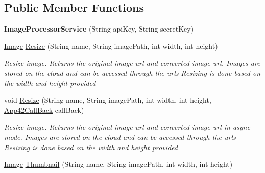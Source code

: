 \subsection*{Public Member Functions}
\begin{DoxyCompactItemize}
\item 
\hypertarget{classcom_1_1shephertz_1_1app42_1_1paas_1_1sdk_1_1csharp_1_1image_processor_1_1_image_processor_service_a2472e305aae946b1708b7ed0b2ae4d7a}{{\bfseries Image\+Processor\+Service} (String api\+Key, String secret\+Key)}\label{classcom_1_1shephertz_1_1app42_1_1paas_1_1sdk_1_1csharp_1_1image_processor_1_1_image_processor_service_a2472e305aae946b1708b7ed0b2ae4d7a}

\item 
\hyperlink{classcom_1_1shephertz_1_1app42_1_1paas_1_1sdk_1_1csharp_1_1image_processor_1_1_image}{Image} \hyperlink{classcom_1_1shephertz_1_1app42_1_1paas_1_1sdk_1_1csharp_1_1image_processor_1_1_image_processor_service_aa44d1dad36e6a0bf2c5f7ec6c914bd20}{Resize} (String name, String image\+Path, int width, int height)
\begin{DoxyCompactList}\small\item\em Resize image. Returns the original image url and converted image url. Images are stored on the cloud and can be accessed through the urls Resizing is done based on the width and height provided \end{DoxyCompactList}\item 
void \hyperlink{classcom_1_1shephertz_1_1app42_1_1paas_1_1sdk_1_1csharp_1_1image_processor_1_1_image_processor_service_a548cd176c784a8bb6bc9670a248d6ab9}{Resize} (String name, String image\+Path, int width, int height, \hyperlink{interfacecom_1_1shephertz_1_1app42_1_1paas_1_1sdk_1_1csharp_1_1_app42_call_back}{App42\+Call\+Back} call\+Back)
\begin{DoxyCompactList}\small\item\em Resize image. Returns the original image url and converted image url in async mode. Images are stored on the cloud and can be accessed through the urls Resizing is done based on the width and height provided \end{DoxyCompactList}\item 
\hyperlink{classcom_1_1shephertz_1_1app42_1_1paas_1_1sdk_1_1csharp_1_1image_processor_1_1_image}{Image} \hyperlink{classcom_1_1shephertz_1_1app42_1_1paas_1_1sdk_1_1csharp_1_1image_processor_1_1_image_processor_service_ae762d4121220473ef2c12551010e916f}{Thumbnail} (String name, String image\+Path, int width, int height)

\end{DoxyCompactItemize}
